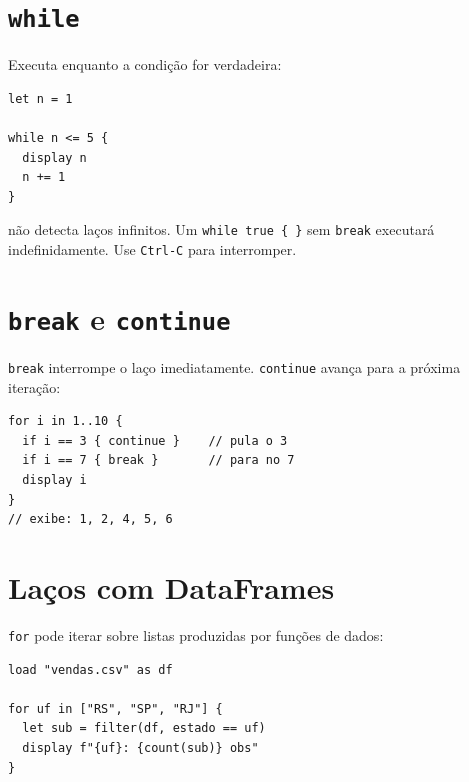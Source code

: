 \section{\texttt{while}}

Executa enquanto a condição for verdadeira:

\begin{lstlisting}[caption={while básico}]
let n = 1

while n <= 5 {
  display n
  n += 1
}
\end{lstlisting}

\begin{aviso}
  \hayashi{} não detecta laços infinitos. Um \lstinline|while true { }| sem
  \lstinline{break} executará indefinidamente. Use \texttt{Ctrl-C} para interromper.
\end{aviso}

\section{\texttt{break} e \texttt{continue}}

\lstinline{break} interrompe o laço imediatamente. \lstinline{continue} avança para
a próxima iteração:

\begin{lstlisting}[caption={break e continue}]
for i in 1..10 {
  if i == 3 { continue }    // pula o 3
  if i == 7 { break }       // para no 7
  display i
}
// exibe: 1, 2, 4, 5, 6
\end{lstlisting}

\section{Laços com DataFrames}

\lstinline{for} pode iterar sobre listas produzidas por funções de dados:

\begin{lstlisting}[caption={Iterando sobre grupos}]
load "vendas.csv" as df

for uf in ["RS", "SP", "RJ"] {
  let sub = filter(df, estado == uf)
  display f"{uf}: {count(sub)} obs"
}
\end{lstlisting}
